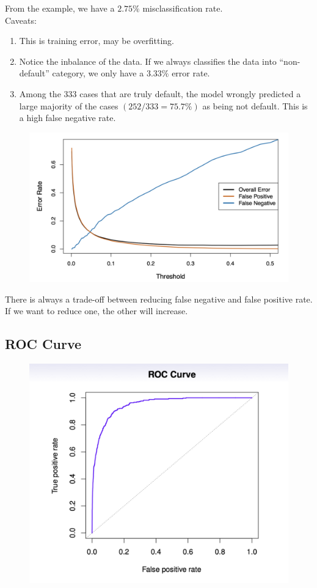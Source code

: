 \documentclass{article}
\begin{document}
From the example, we have a $2.75\%$ misclassification rate.\\

Caveats:
\begin{enumerate}
    \item This is training error, may be overfitting.
    \item Notice the inbalance of the data. If we always classifies the data into ``non-default'' category, we only have a $3.33\%$ error rate.
    \item Among the 333 cases that are truly default, the model wrongly predicted a large majority of the cases $(252/333 = 75.7\%)$ as being not default. This is a high false negative rate.
\end{enumerate}

\begin{figure}[h!]
    \centering
    \includegraphics[width=0.75\linewidth]{FN_FP_tradeoff.png}
    \label{FN_FP_tradeoff}
\end{figure}

There is always a trade-off between reducing false negative and false positive rate. If we want to reduce one, the other will increase.

\newpage

\subsection{ROC Curve}

\begin{figure}[h!]
    \centering
    \includegraphics[width=0.5\linewidth]{ROC.png}
    \label{ROC}
\end{figure}
\end{document}
